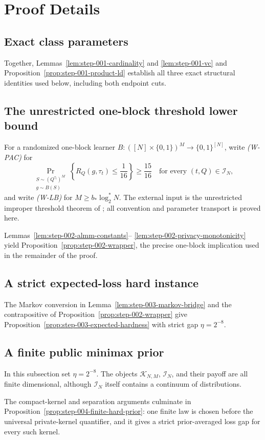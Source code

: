 \appendix

\section{Proof Details}\label{sec:proof-details}

\subsection{Exact class parameters}\label{app:step-001}

Together, Lemmas~\ref{lem:step-001-cardinality} and
\ref{lem:step-001-vc} and
Proposition~\ref{prop:step-001-product-ld} establish all three exact
structural identities used below, including both endpoint cuts.

\subsection{The unrestricted one-block threshold lower bound}\label{app:step-002}
For a randomized one-block learner
$B:([N]\times\{0,1\})^M\to\{0,1\}^{[N]}$, write \emph{(W-PAC)} for
\[
\Pr_{\substack{S\sim(Q^{\tau_t})^M\\g\sim B(S)}}
\left\{R_Q(g,\tau_t)\le\frac1{16}\right\}
\ge\frac{15}{16}
\quad\text{for every }(t,Q)\in\mathcal I_N,
\]
and write \emph{(W-LB)} for $M\ge b_*\log_2^*N$.  The external input is
the unrestricted improper threshold theorem of
\citet{AlonLivniMalliarisMoran2019}; all convention and parameter transport
is proved here.

Lemmas~\ref{lem:step-002-almm-constants}--
\ref{lem:step-002-privacy-monotonicity} yield
Proposition~\ref{prop:step-002-wrapper}, the precise one-block implication
used in the remainder of the proof.

\subsection{A strict expected-loss hard instance}\label{app:step-003}

The Markov conversion in Lemma~\ref{lem:step-003-markov-bridge} and the
contrapositive of Proposition~\ref{prop:step-002-wrapper} give
Proposition~\ref{prop:step-003-expected-hardness} with strict gap
$\eta=2^{-8}$.

\subsection{A finite public minimax prior}\label{app:step-004}
In this subsection set $\eta=2^{-8}$.  The objects
$\mathcal K_{N,M}$, $\mathcal I_N$, and their payoff are all finite
dimensional, although $\mathcal I_N$ itself contains a continuum of
distributions.

The compact-kernel and separation arguments culminate in
Proposition~\ref{prop:step-004-finite-hard-prior}: one finite law is chosen
before the universal private-kernel quantifier, and it gives a strict
prior-averaged loss gap for every such kernel.

